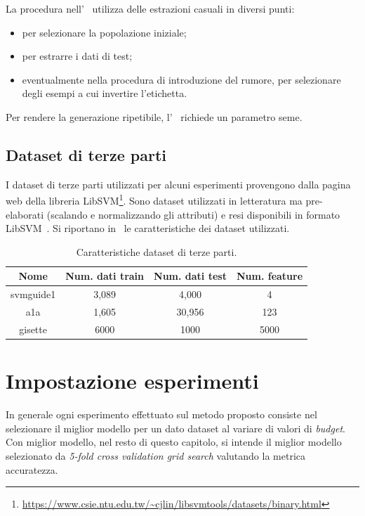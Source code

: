 La procedura nell'~ utilizza delle estrazioni casuali in diversi punti:
\begin{itemize}
    \item per selezionare la popolazione iniziale;
    \item per estrarre i dati di test;
    \item eventualmente nella procedura di introduzione del rumore, per selezionare degli esempi a cui invertire l'etichetta.
\end{itemize}
Per rendere la generazione ripetibile, l'~ richiede un parametro seme.


\subsection{Dataset di terze parti}
I dataset di terze parti utilizzati per alcuni esperimenti provengono dalla pagina web della libreria LibSVM\footnote{\url{https://www.csie.ntu.edu.tw/~cjlin/libsvmtools/datasets/binary.html}}.
Sono dataset utilizzati in letteratura ma pre-elaborati (scalando e normalizzando gli attributi) e resi disponibili in formato LibSVM~\cite{libsvm}.
Si riportano in~ le caratteristiche dei dataset utilizzati.
\begin{table}
    \centering
    \begin{tabular}{cccc}
        \toprule
        Nome & Num. dati train & Num. dati test & Num. feature\\
        \midrule
        svmguide1 &  3,089 & 4,000 & 4 \\
        a1a & 1,605	& 30,956 & 123\\
        gisette & 6000 & 1000 & 5000 \\
        \bottomrule
    \end{tabular}
    \caption{Caratteristiche dataset di terze parti.}
    \label{tab:uci_datasets}
\end{table}


\section{Impostazione esperimenti}
In generale ogni esperimento effettuato sul metodo proposto consiste nel selezionare il miglior modello per un dato dataset al variare di valori di \emph{budget}.
Con miglior modello, nel resto di questo capitolo, si intende il miglior modello selezionato da \emph{5-fold cross validation grid search} valutando la metrica accuratezza. 

